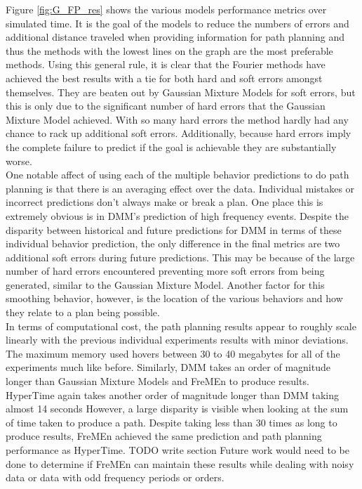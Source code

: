 Figure \ref{fig:G_FP_res} shows the various models performance metrics over
simulated time. It is the goal of the models to reduce the numbers of errors
and additional distance traveled when providing information for path planning
and thus the methods with the lowest lines on the graph are the most
preferable methods. Using this general rule, it is clear that the Fourier
methods have achieved the best results with a tie for both hard and soft errors
amongst themselves. They are beaten out by Gaussian Mixture Models for soft
errors, but this is only due to the significant number of hard errors that
the Gaussian Mixture Model achieved. With so many hard errors the method hardly
had any chance to rack up additional soft errors. Additionally, because hard
errors imply the complete failure to predict if the goal is achievable they
are substantially worse. \\

One notable affect of using each of the multiple behavior predictions to do path
planning is that there is an averaging effect over the data. Individual mistakes
or incorrect predictions don't always make or break a plan. One place this is
extremely obvious is in DMM's prediction of high frequency events.
Despite the disparity between historical and future predictions for DMM in
terms of these individual behavior prediction, the only difference in the final
metrics are two additional soft errors during future predictions. This may be
because of the large number of hard errors encountered preventing more
soft errors from being generated, similar to the Gaussian Mixture Model.
Another factor for this smoothing behavior, however, is the location of the
various behaviors and how they relate to a plan being possible. \\

In terms of computational cost, the path planning results appear to roughly
scale linearly with the previous individual experiments results with minor
deviations. The maximum memory used hovers between 30 to 40 megabytes for all
of the experiments much like before. Similarly, DMM takes an order of
magnitude longer than Gaussian Mixture Models and FreMEn to produce results.
HyperTime again takes another order of magnitude longer than DMM taking
almost 14 seconds However, a large disparity is visible when looking at the
sum of time taken to produce a path. Despite taking less than 30 times as long
to produce results, FreMEn achieved the same prediction and path planning
performance as HyperTime. TODO write section Future work would need to be done
to determine if FreMEn can maintain these results while dealing with noisy
data or data with odd frequency periods or orders. \\



